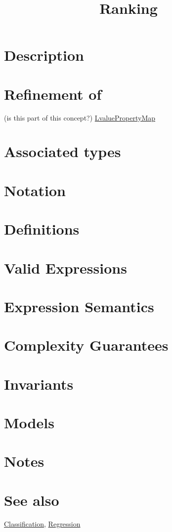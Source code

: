 \documentclass{article}
\begin{document}
\title{Ranking}
\maketitle

\section*{Description}
\section*{Refinement of}

(is this part of this concept?)
\href{http://www.boost.org/libs/property_map/LvaluePropertyMap.html}{LvaluePropertyMap}

\section*{Associated types}
\section*{Notation}
\section*{Definitions}
\section*{Valid Expressions}
\section*{Expression Semantics}
\section*{Complexity Guarantees}
\section*{Invariants}
\section*{Models}
\section*{Notes}
\section*{See also}

\href{\kmlroot/classification.html}{Classification},
\href{\kmlroot/regression.html}{Regression}



\end{document}
